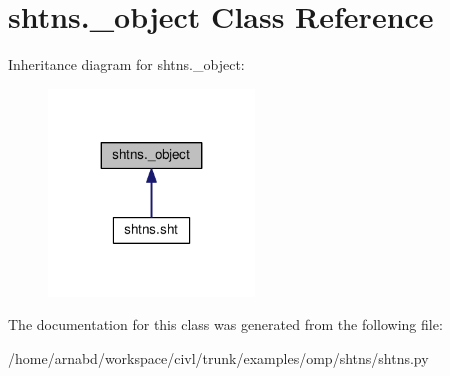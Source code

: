 \hypertarget{classshtns_1_1__object}{}\section{shtns.\+\_\+object Class Reference}
\label{classshtns_1_1__object}


Inheritance diagram for shtns.\+\_\+object\+:
\nopagebreak
\begin{figure}[H]
\begin{center}
\leavevmode
\includegraphics[width=155pt]{classshtns_1_1__object__inherit__graph}
\end{center}
\end{figure}


The documentation for this class was generated from the following file\+:\begin{DoxyCompactItemize}
\item 
/home/arnabd/workspace/civl/trunk/examples/omp/shtns/shtns.\+py\end{DoxyCompactItemize}
